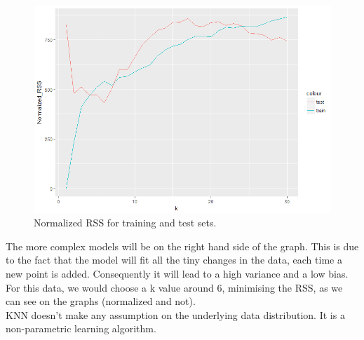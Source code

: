 \documentclass[11pt,a4paper,twoside,openright]{report}
\begin{document}
\begin{figure}[H]
	\centering
	\includegraphics[width=0.7\linewidth]{"img/RplotRSSNormalized"}
	\caption{Normalized RSS for training and test sets.}
	\label{fig:rplotrssnormalized}
\end{figure}




The more complex models will be on the right hand side of the graph. This is due to the fact that the model will fit all the tiny changes in the data, each time a new point is added. Consequently it will lead to a high variance and a low bias. For this data, we would choose a k value around 6, minimising the RSS, as we can see on the graphs (normalized and not). \\

\noindent KNN doesn't make any assumption on the underlying data distribution. It is a non-parametric learning algorithm. 







	
	
\end{document}
